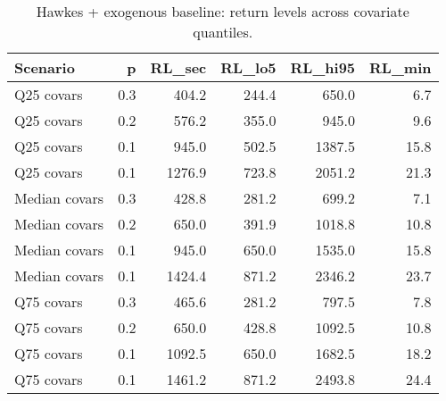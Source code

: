 \begin{table}
\caption{Hawkes + exogenous baseline: return levels across covariate quantiles.}
\label{tab:hawkes_exog_rl}
\begin{tabular}{lrrrrr}
\toprule
Scenario & p & RL_sec & RL_lo5 & RL_hi95 & RL_min \\
\midrule
Q25 covars & 0.3 & 404.2 & 244.4 & 650.0 & 6.7 \\
Q25 covars & 0.2 & 576.2 & 355.0 & 945.0 & 9.6 \\
Q25 covars & 0.1 & 945.0 & 502.5 & 1387.5 & 15.8 \\
Q25 covars & 0.1 & 1276.9 & 723.8 & 2051.2 & 21.3 \\
Median covars & 0.3 & 428.8 & 281.2 & 699.2 & 7.1 \\
Median covars & 0.2 & 650.0 & 391.9 & 1018.8 & 10.8 \\
Median covars & 0.1 & 945.0 & 650.0 & 1535.0 & 15.8 \\
Median covars & 0.1 & 1424.4 & 871.2 & 2346.2 & 23.7 \\
Q75 covars & 0.3 & 465.6 & 281.2 & 797.5 & 7.8 \\
Q75 covars & 0.2 & 650.0 & 428.8 & 1092.5 & 10.8 \\
Q75 covars & 0.1 & 1092.5 & 650.0 & 1682.5 & 18.2 \\
Q75 covars & 0.1 & 1461.2 & 871.2 & 2493.8 & 24.4 \\
\bottomrule
\end{tabular}
\end{table}
